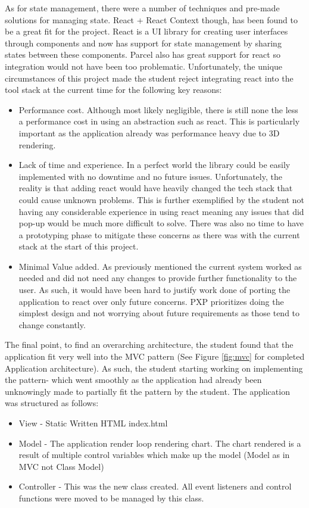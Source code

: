 As for state management, there were a number of techniques and pre-made solutions for managing state. React + React Context though, has been found to be a great fit for the project. React is a UI library for creating user interfaces through components and now has support for state management by sharing states between these components. Parcel also has great support for react so integration would not have been too problematic. Unfortunately, the unique circumstances of this project made the student reject integrating react into the tool stack at the current time for the following key reasons:
\begin{itemize}
    \item Performance cost. Although most likely negligible, there is still none the less a performance cost in using an abstraction such as react. This is particularly important as the application already was performance heavy due to 3D rendering.
    \item Lack of time and experience. In a perfect world the library could be easily implemented with no downtime and no future issues. Unfortunately, the reality is that adding react would have heavily changed the tech stack that could cause unknown problems. This is further exemplified by the student not having any considerable experience in using react meaning any issues that did pop-up would be much more difficult to solve. There was also no time to have a prototyping phase to mitigate these concerns as there was with the current stack at the start of this project.
    \item Minimal Value added. As previously mentioned the current system worked as needed and did not need any changes to provide further functionality to the user. As such, it would have been hard to justify work done of porting the application to react over only future concerns. PXP prioritizes doing the simplest design and not worrying about future requirements as those tend to change constantly.
\end{itemize}

The final point, to find an overarching architecture, the student found that the application fit very well into the MVC pattern (See Figure \ref{fig:mvc} for completed Application architecture). As such, the student starting working on implementing the pattern- which went smoothly as the application had already been unknowingly made to partially fit the pattern by the student.
The application was structured as follows:
\begin{itemize}
    \item View - Static Written HTML index.html
    \item Model - The application render loop rendering chart. The chart rendered is a result of multiple control variables which make up the model (Model as in MVC not Class Model)
    \item Controller - This was the new class created. All event listeners and control functions were moved to be managed by this class.
\end{itemize}

